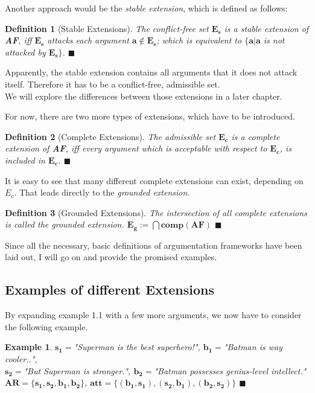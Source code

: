 \documentclass[12pt]{report}
\numberwithin{figure}{chapter}
\theoremstyle{break}
\newtheorem{defn}{Definition}[chapter]
\newtheorem{exmpl}{Example}[chapter]
\newenvironment{mydefn}{\begin{defn}}{$\blacksquare$ \end{defn}}
\newenvironment{myexmpl}{\begin{exmpl}}{$\blacksquare$ \end{exmpl}}
\begin{document}
\newpage

Another approach would be the \textit{stable extension}, which is defined as follows:
\begin{mydefn}[Stable Extensions]
The conflict-free set $\bm{E_{s}}$ is a stable extension of \textbf{AF}, iff $\bm{E_{s}}$ attacks each argument $\bm{a \notin E_{s}}$; which is equivalent to
$\bm{\{a|a}$ is not attacked by $\bm{E_{s}\}}$.
\end{mydefn}

Apparently, the stable extension contains all arguments that it does not attack itself. Therefore it has to be a conflict-free, admissible set.\\
We will explore the differences between those extensions in a later chapter. 

For now, there are two more types of extensions, which have to be introduced.

\begin{mydefn}[Complete Extensions]
The admissible set $\bm{E_{c}}$ is a complete extension of \textbf{AF}, iff every argument which is acceptable with respect to $\bm{E_{c}}$, is included in $\bm{E_{c}}$.
\end{mydefn}

It is easy to see that many different complete extensions can exist, depending on $E_{c}$. That leads directly to the \textit{grounded extension}.

\begin{mydefn}[Grounded Extensions]
The intersection of all complete extensions is called the grounded extension. $\bm{E_{g} := \bigcap{comp(AF)}}$
\label{ground ext}
\end{mydefn}

Since all the necessary, basic definitions of argumentation frameworks have been laid out, I will go on and provide the promised examples.

\subsection{Examples of different Extensions}
By expanding example 1.1 with a few more arguments, we now have to consider the following example.

\begin{myexmpl}
$\bm{s_{1}=}$"Superman is the best superhero!", $\bm{b_{1}=}$"Batman is way cooler..",\\
$\bm{s_{2}=}$"But Superman is stronger.", $\bm{b_{2}=}$"Batman possesses genius-level intellect."\\
$\bm{AR = \{s_{1},s_{2},b_{1},b_{2}\}}$, $\bm{att = \{(b_{1},s_{1}),(s_{2},b_{1}),(b_{2},s_{2})\}}$
\label{s1 s2 b1 b2 ex}
\end{myexmpl}
\end{document}
